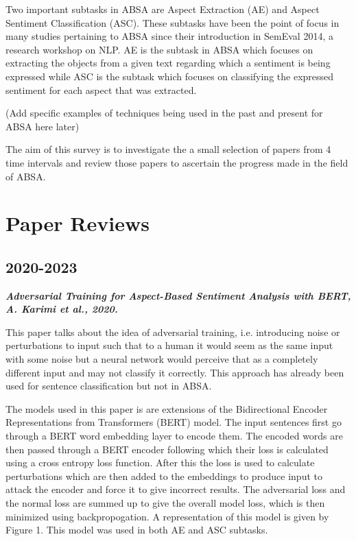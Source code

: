\documentclass[conference]{IEEEtran}
\begin{document}
Two important subtasks in ABSA are Aspect Extraction (AE) and Aspect Sentiment Classification (ASC). These subtasks have been the point of focus in many studies pertaining to ABSA since their introduction in SemEval 2014, a research workshop on NLP. AE is the subtask in ABSA which focuses on extracting the objects from a given text regarding which a sentiment is being expressed while ASC is the subtask which focuses on classifying the expressed sentiment for each aspect that was extracted.

(Add specific examples of techniques being used in the past and present for ABSA here later)

The aim of this survey is to investigate the a small selection of papers from 4 time intervals and review those papers to ascertain the progress made in the field of ABSA.

\section{Paper Reviews}

\subsection{2020-2023}

\textit{\textbf{Adversarial Training for Aspect-Based Sentiment
Analysis with BERT, A. Karimi et al., 2020.}}

This paper talks about the idea of adversarial training, i.e. introducing noise or perturbations to input such that to a human it would seem as the same input with some noise but a neural network would perceive that as a completely different input and may not classify it correctly. This approach has already been used for sentence classification but not in ABSA.

The models used in this paper is are extensions of the Bidirectional Encoder Representations from Transformers (BERT) model. The input sentences first go through a BERT word embedding layer to encode them. The encoded words are then passed through a BERT encoder following which their loss is calculated using a cross entropy loss function. After this the loss is used to calculate perturbations which are then added to the embeddings to produce input to attack the encoder and force it to give incorrect results. The adversarial loss and the normal loss are summed up to give the overall model loss, which is then minimized using backpropogation. A representation of this model is given by Figure 1. This model was used in both AE and ASC subtasks.
\end{document}

